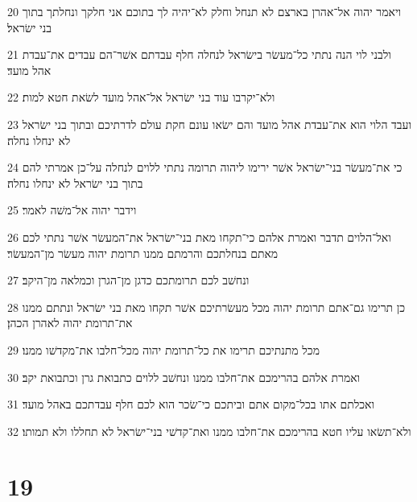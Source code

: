 \par 20 ויאמר יהוה אל־אהרן בארצם לא תנחל וחלק לא־יהיה לך בתוכם אני חלקך ונחלתך בתוך בני ישׂראל׃
\par 21 ולבני לוי הנה נתתי כל־מעשׂר בישׂראל לנחלה חלף עבדתם אשׁר־הם עבדים את־עבדת אהל מועד׃
\par 22 ולא־יקרבו עוד בני ישׂראל אל־אהל מועד לשׂאת חטא למות׃
\par 23 ועבד הלוי הוא את־עבדת אהל מועד והם ישׂאו עונם חקת עולם לדרתיכם ובתוך בני ישׂראל לא ינחלו נחלה׃
\par 24 כי את־מעשׂר בני־ישׂראל אשׁר ירימו ליהוה תרומה נתתי ללוים לנחלה על־כן אמרתי להם בתוך בני ישׂראל לא ינחלו נחלה׃
\par 25 וידבר יהוה אל־משׁה לאמר׃
\par 26 ואל־הלוים תדבר ואמרת אלהם כי־תקחו מאת בני־ישׂראל את־המעשׂר אשׁר נתתי לכם מאתם בנחלתכם והרמתם ממנו תרומת יהוה מעשׂר מן־המעשׂר׃
\par 27 ונחשׁב לכם תרומתכם כדגן מן־הגרן וכמלאה מן־היקב׃
\par 28 כן תרימו גם־אתם תרומת יהוה מכל מעשׂרתיכם אשׁר תקחו מאת בני ישׂראל ונתתם ממנו את־תרומת יהוה לאהרן הכהן׃
\par 29 מכל מתנתיכם תרימו את כל־תרומת יהוה מכל־חלבו את־מקדשׁו ממנו׃
\par 30 ואמרת אלהם בהרימכם את־חלבו ממנו ונחשׁב ללוים כתבואת גרן וכתבואת יקב׃
\par 31 ואכלתם אתו בכל־מקום אתם וביתכם כי־שׂכר הוא לכם חלף עבדתכם באהל מועד׃
\par 32 ולא־תשׂאו עליו חטא בהרימכם את־חלבו ממנו ואת־קדשׁי בני־ישׂראל לא תחללו ולא תמותו׃

\chapter{19}

